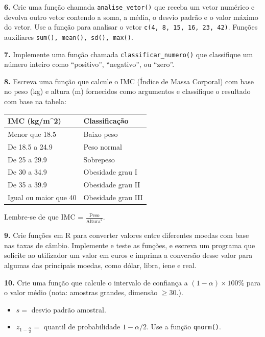 \documentclass[
]{book}
\begin{document}
\textbf{6.} Crie uma função chamada \texttt{analise\_vetor()} que receba um vetor
numérico e devolva outro vetor contendo a soma, a média, o desvio padrão
e o valor máximo do vetor. Use a função para analisar o vetor
\texttt{c(4,\ 8,\ 15,\ 16,\ 23,\ 42)}. Funções auxiliares
\texttt{sum(),\ mean(),\ sd(),\ max()}.

\textbf{7.} Implemente uma função chamada \texttt{classificar\_numero()} que
classifique um número inteiro como ``positivo'', ``negativo'', ou ``zero''.

\textbf{8.} Escreva uma função que calcule o IMC (Índice de Massa Corporal)
com base no peso (kg) e altura (m) fornecidos como argumentos e
classifique o resultado com base na tabela:

\begin{longtable}[]{@{}ll@{}}
\toprule\noalign{}
\textbf{IMC (kg/m\^{}2)} & \textbf{Classificação} \\
\midrule\noalign{}
\endhead
\bottomrule\noalign{}
\endlastfoot
Menor que 18.5 & Baixo peso \\
De 18.5 a 24.9 & Peso normal \\
De 25 a 29.9 & Sobrepeso \\
De 30 a 34.9 & Obesidade grau I \\
De 35 a 39.9 & Obesidade grau II \\
Igual ou maior que 40 & Obesidade grau III \\
\end{longtable}

Lembre-se de que IMC = \(\frac{\text{Peso}}{\text{Altura}^2}\).

\textbf{9.} Crie funções em R para converter valores entre diferentes moedas
com base nas taxas de câmbio. Implemente e teste as funções, e escreva
um programa que solicite ao utilizador um valor em euros e imprima a
conversão desse valor para algumas das principais moedas, como dólar,
libra, iene e real.

\textbf{10.} Crie uma função que calcule o intervalo de confiança a \((1-\alpha)\times 100\%\) para o
valor médio (nota: amostras grandes, dimensão \(\geq 30\).).

\begin{itemize}
\item
  \(s =\) desvio padrão amostral.
\item
  \(z_{1-\frac{\alpha}{2}} =\) quantil de probabilidade \(1-\alpha/2\). Use a função \texttt{qnorm()}.
\end{itemize}
\end{document}
